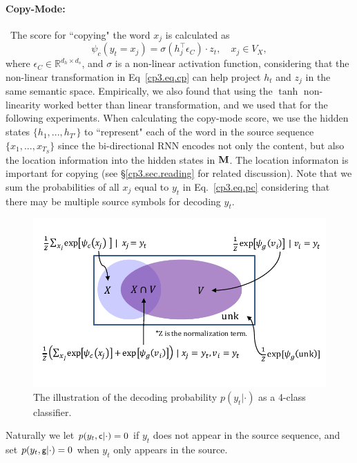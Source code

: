 \paragraph{Copy-Mode:}~The score for ``copying" the word $x_j$ is calculated as 
\begin{equation}\label{cp3.eq.cp}
	\psi_c(y_t=x_j) = \sigma\left(h_j^\top \epsilon_C \right)\cdot z_t, \quad  x_j \in V_X,
\end{equation}
where $\epsilon_C \in \mathbb{R}^{d_h \times d_s}$, and $\sigma$ is a non-linear activation function, considering that the non-linear transformation in Eq~\eqref{cp3.eq.cp} can help project $h_t$ and $z_j$ in the same semantic space. Empirically,  we also found that using the $\tanh$ non-linearity worked better than linear transformation, and we used that for the following experiments.
When calculating the copy-mode score, we use the hidden states $\{ h_1, ..., h_{T'} \} $ to ``represent" each of the word in the source sequence $\{x_1, ..., x_{T_S}\}$ since the bi-directional RNN encodes not only the content, 
but also the location information into the hidden states in $\mathbf{M}$. The location informaton is important for copying (see \S\ref{cp3.sec.reading} for related discussion). 
Note that we sum the probabilities of all $x_j$ equal to $y_t$ in Eq.~\eqref{cp3.eq.pc} considering that there may be multiple source symbols for decoding $y_t$. 
\begin{figure}[htpb]
   	\centering
          	\includegraphics[width=0.85\linewidth]{figs/copynet/oov.pdf} 
          	\caption{\label{cp3.fig.oov} The illustration of  the decoding probability $p(y_t|\cdot)$
          	 as a 4-class classifier. } 
  \end{figure}   
Naturally we let $p(y_t, \textsf{\small c}|\cdot)=0$ if $y_t$ does not appear in the source sequence, 
and set $p(y_t, \textsf{\small g}|\cdot)=0$ when $y_t$ only appears in the source. %

